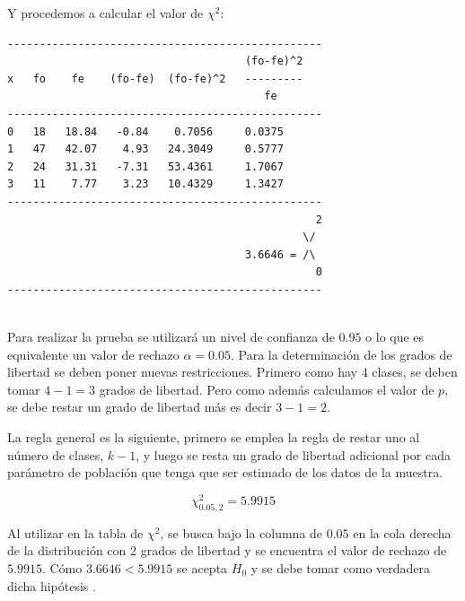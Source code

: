 Y procedemos a calcular el valor de $\chi^2$:
\begin{verbatim}
-------------------------------------------------
                                     (fo-fe)^2
x   fo    fe    (fo-fe)  (fo-fe)^2   ---------
                                        fe
-------------------------------------------------
0   18   18.84   -0.84    0.7056     0.0375
1   47   42.07    4.93   24.3049     0.5777
2   24   31.31   -7.31   53.4361     1.7067
3   11    7.77    3.23   10.4329     1.3427
-------------------------------------------------
                                                2
                                              \/
                                     3.6646 = /\
                                                0
-------------------------------------------------
    
\end{verbatim}



Para realizar la prueba se utilizará un nivel de confianza de $0.95$ o lo que es equivalente un valor de rechazo $\alpha = 0.05$. Para la determinación de los grados de libertad se deben poner nuevas restricciones. Primero como hay 4 clases, se deben tomar $4-1 = 3$ grados de libertad. Pero como además calculamos el valor de $p$, se debe restar un grado de libertad más es decir $3-1 = 2$.

La regla general es la siguiente, primero se emplea la regla de restar uno al número de clases, $k-1$, y luego se resta un grado de libertad adicional por cada parámetro de población que tenga que ser estimado de los datos de la muestra.  

$$\chi^2_{0.05,2} = 5.9915$$

Al utilizar en la tabla de $\chi^2$, se busca bajo la columna de $0.05$ en la cola derecha de la distribución con 2 grados de libertad y se encuentra el valor de rechazo de $5.9915$. Cómo $3.6646 < 5.9915$ se acepta $H_0$ y se debe tomar como verdadera dicha hipótesis .


